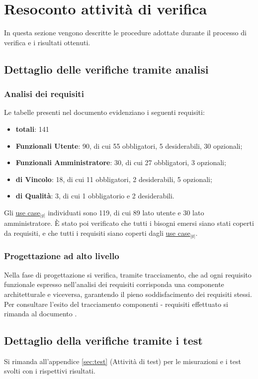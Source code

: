 \section{Resoconto attività di verifica} {
  In questa sezione vengono descritte le procedure adottate durante il processo di verifica e i risultati ottenuti.
   
  \subsection{Dettaglio delle verifiche tramite analisi}{
	\subsubsection{Analisi dei requisiti}{
	 	Le tabelle presenti nel documento \emph{\AnalisiDeiRequisiti} evidenziano i seguenti requisiti:
	\begin{itemize}
		\item \textbf{totali}: 141
		\item \textbf{Funzionali Utente}: 90, di cui 55 obbligatori, 5 desiderabili, 30 opzionali;
		\item \textbf{Funzionali Amministratore}: 30, di cui 27 obbligatori, 3 opzionali;
		\item \textbf{di Vincolo}: 18, di cui 11 obbligatori, 2 desiderabili, 5 opzionali;
		\item \textbf{di Qualità}: 3, di cui 1 obbligatorio e 2 desiderabili.
	\end{itemize}
	Gli \underline{use case}$_{|g|}$ individuati sono 119, di cui 89 lato utente e 30 lato amministratore.
	\`E stato poi verificato che tutti i bisogni emersi siano stati coperti da requisiti, e che tutti i requisiti siano coperti
	dagli \underline{use case}$_{|g|}$.
		}
	}
	
	\subsubsection{Progettazione ad alto livello}{
	Nella fase di progettazione si verifica, tramite tracciamento, che ad ogni
	requisito funzionale espresso nell’analisi dei requisiti corrisponda una
	componente architetturale e viceversa, garantendo il pieno soddisfacimento dei
	requisiti stessi.\\
	Per consultare l’esito del tracciamento componenti - requisiti effettuato si
	rimanda al documento \textit{\SpecificaTecnica}.
	}
	
	\subsection{Dettaglio della verifiche tramite i test}{
	Si rimanda all'appendice \ref{sec:test} (Attività di test) per le misurazioni e i test svolti con i rispettivi risultati.
	}
	
}
